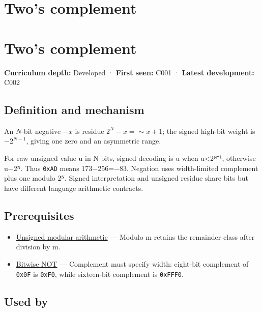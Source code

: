 \hypertarget{appendix-4fbc03d20829}{}
\section*{Two's complement}
\section{Two's complement}\label{twos-complement}

\textbf{Curriculum depth:} Developed · \textbf{First seen:} C001 · \textbf{Latest development:} C002

\subsection{Definition and mechanism}\label{definition-and-mechanism}

An \(N\)-bit negative \(-x\) is residue \(2^N-x=\sim x+1\); the signed high-bit weight is \(-2^{N-1}\), giving one zero and an asymmetric range.

For raw unsigned value u in N bits, signed decoding is u when u\textless2ᴺ⁻¹, otherwise u−2ᴺ. Thus \texttt{0xAD} means 173−256=−83. Negation uses width-limited complement plus one modulo 2ᴺ. Signed interpretation and unsigned residue share bits but have different language arithmetic contracts.

\subsection{Prerequisites}\label{prerequisites}

\begin{itemize}
\tightlist
\item
  \hyperref[appendix-c99977d88b33]{Unsigned modular arithmetic} --- Modulo m retains the remainder class after division by m.
\item
  \hyperref[appendix-8f38927cfc54]{Bitwise NOT} --- Complement must specify width: eight-bit complement of \texttt{0x0F} is \texttt{0xF0}, while sixteen-bit complement is \texttt{0xFFF0}.
\end{itemize}

\subsection{Used by}\label{used-by}

